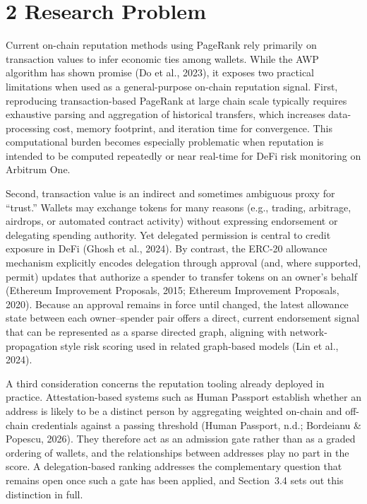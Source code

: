 \clearpage
{}
\section*{2 \textbf{Research Problem}}
\label{sec:research-problem}

Current on-chain reputation methods using PageRank rely primarily on transaction values to infer economic ties among wallets. While the AWP algorithm has shown promise (Do et al., 2023), it exposes two practical limitations when used as a general-purpose on-chain reputation signal. First, reproducing transaction-based PageRank at large chain scale typically requires exhaustive parsing and aggregation of historical transfers, which increases data-processing cost, memory footprint, and iteration time for convergence. This computational burden becomes especially problematic when reputation is intended to be computed repeatedly or near real-time for DeFi risk monitoring on Arbitrum One.


Second, transaction value is an indirect and sometimes ambiguous proxy for ``trust.'' Wallets may exchange tokens for many reasons (e.g., trading, arbitrage, airdrops, or automated contract activity) without expressing endorsement or delegating spending authority. Yet delegated permission is central to credit exposure in DeFi (Ghosh et al., 2024). By contrast, the ERC-20 allowance mechanism explicitly encodes delegation through approval (and, where supported, permit) updates that authorize a spender to transfer tokens on an owner's behalf (Ethereum Improvement Proposals, 2015; Ethereum Improvement Proposals, 2020). Because an approval remains in force until changed, the latest allowance state between each owner--spender pair offers a direct, current endorsement signal that can be represented as a sparse directed graph, aligning with network-propagation style risk scoring used in related graph-based models (Lin et al., 2024).


A third consideration concerns the reputation tooling already deployed in practice. Attestation-based systems such as Human Passport establish whether an address is likely to be a distinct person by aggregating weighted on-chain and off-chain credentials against a passing threshold (Human Passport, n.d.; Bordeianu \& Popescu, 2026). They therefore act as an admission gate rather than as a graded ordering of wallets, and the relationships between addresses play no part in the score. A delegation-based ranking addresses the complementary question that remains open once such a gate has been applied, and Section~3.4 sets out this distinction in full.


